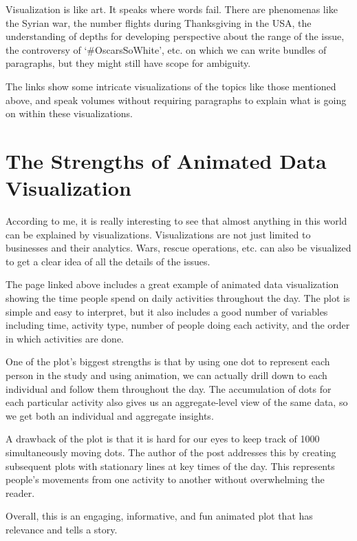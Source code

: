 \documentclass[]{book}
\theoremstyle{definition}
\theoremstyle{definition}
\theoremstyle{definition}
\theoremstyle{remark}
\begin{document}
Visualization is like art. It speaks where words fail. There are
phenomenas like the Syrian war, the number flights during Thanksgiving
in the USA, the understanding of depths for developing perspective about
the range of the issue, the controversy of `\#OscarsSoWhite', etc. on
which we can write bundles of paragraphs, but they might still have
scope for ambiguity.

The links show some intricate visualizations of the topics like those
mentioned above, and speak volumes without requiring paragraphs to
explain what is going on within these visualizations.

\section{The Strengths of Animated Data
Visualization}\label{the-strengths-of-animated-data-visualization}

\citep{American_life} According to me, it is really interesting to see
that almost anything in this world can be explained by visualizations.
Visualizations are not just limited to businesses and their analytics.
Wars, rescue operations, etc. can also be visualized to get a clear idea
of all the details of the issues.

The page linked above includes a great example of animated data
visualization showing the time people spend on daily activities
throughout the day. The plot is simple and easy to interpret, but it
also includes a good number of variables including time, activity type,
number of people doing each activity, and the order in which activities
are done.

One of the plot's biggest strengths is that by using one dot to
represent each person in the study and using animation, we can actually
drill down to each individual and follow them throughout the day. The
accumulation of dots for each particular activity also gives us an
aggregate-level view of the same data, so we get both an individual and
aggregate insights.

A drawback of the plot is that it is hard for our eyes to keep track of
1000 simultaneously moving dots. The author of the post addresses this
by creating subsequent plots with stationary lines at key times of the
day. This represents people's movements from one activity to another
without overwhelming the reader.

Overall, this is an engaging, informative, and fun animated plot that
has relevance and tells a story.
\end{document}
